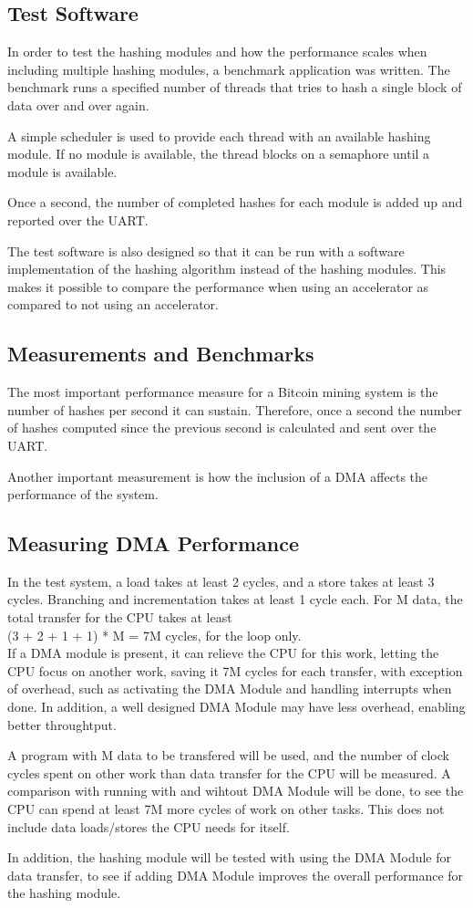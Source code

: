 \subsection{Test Software}
In order to test the hashing modules and how the performance scales when including
multiple hashing modules, a benchmark application was written. The benchmark
runs a specified number of threads that tries to hash a single block of data
over and over again.

A simple scheduler is used to provide each thread with an available hashing module.
If no module is available, the thread blocks on a semaphore until a module is available.

Once a second, the number of completed hashes for each module is added up and
reported over the UART.

The test software is also designed so that it can be run with a software implementation
of the hashing algorithm instead of the hashing modules. This makes it possible
to compare the performance when using an accelerator as compared to not using
an accelerator.

\subsection{Measurements and Benchmarks}
The most important performance measure for a Bitcoin mining system is the number
of hashes per second it can sustain. Therefore, once a second the number of hashes
computed since the previous second is calculated and sent over the UART.

Another important measurement is how the inclusion of a DMA affects the performance
of the system.

\subsection{Measuring DMA Performance}

In the test system, a load takes at least 2 cycles, and a store takes at least 3 cycles.
Branching and incrementation takes at least 1 cycle each.
For M data, the total transfer for the CPU takes at least 
\\ (3 + 2 + 1 + 1) * M = 7M cycles, for the loop only.
\\ If a DMA module is present, it can relieve the CPU for this work, letting the CPU focus on another work, saving it 7M cycles for each transfer, with exception of overhead, such as activating the DMA Module and handling interrupts when done.
In addition, a well designed DMA Module may have less overhead, enabling better  throughtput.

A program with M data to be transfered will be used, and the number of clock cycles spent on other work than data transfer for the CPU will be measured.
A comparison with running with and wihtout DMA Module will be done, to see the CPU can spend at least 7M more cycles of work on other tasks.
This does not include data loads/stores the CPU needs for itself.

In addition, the hashing module will be tested with using the DMA Module for data transfer, to see if adding DMA Module improves the overall performance for the hashing module.